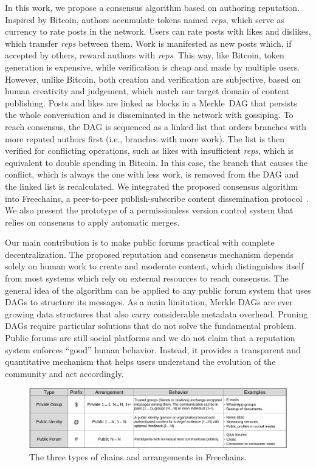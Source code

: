 \documentclass[10pt,journal,compsoc]{IEEEtran}
\newcommand{\FC}       {Freechains\xspace}
\newcommand{\reps}     {\emph{reps}\xspace}
\begin{document}
In this work, we propose a consensus algorithm based on authoring reputation.
Inspired by Bitcoin, authors accumulate tokens named \reps, which serve as
currency to rate posts in the network.
Users can rate posts with likes and dislikes, which transfer \reps between
them.
Work is manifested as new posts which, if accepted by others, reward authors
with \reps.
This way, like Bitcoin, token generation is expensive, while verification is
cheap and made by multiple users.
However, unlike Bitcoin, both creation and verification are subjective, based
on human creativity and judgement, which match our target domain of content
publishing.
Posts and likes are linked as blocks in a Merkle~DAG that persists the whole
conversation and is disseminated in the network with gossiping.
To reach consensus, the DAG is sequenced as a linked list that orders branches
with more reputed authors first (i.e., branches with more work).
The list is then verified for conflicting operations, such as likes with
insufficient \reps, which is equivalent to double spending in Bitcoin.
In this case, the branch that causes the conflict, which is always the one with
less work, is removed from the DAG and the linked list is recalculated.
We integrated the proposed consensus algorithm into Freechains, a peer-to-peer
publish-subscribe content dissemination protocol~\cite{fcs.sbseg20}.
We also present the prototype of a permissionless version control system that
relies on consensus to apply automatic merges.

Our main contribution is to make public forums practical with complete
decentralization.
The proposed reputation and consensus mechanism depends solely on human work to
create and moderate content, which distinguishes itself from most systems which
rely on external resources to reach consensus.
The general idea of the algorithm can be applied to any public forum system
that uses DAGs to structure its messages.
%
As a main limitation, Merkle DAGs are ever growing data structures that also
carry considerable metadata overhead.
Pruning DAGs require particular solutions that do not solve the fundamental
problem.
%
Public forums are still social platforms and we do not claim that a reputation
system enforces ``good'' human behavior.
Instead, it provides a transparent and quantitative mechanism that helps users
understand the evolution of the community and act accordingly.

\begin{figure}
\centering
\includegraphics[width=\textwidth]{arrangements.png}
\caption{The three types of chains and arrangements in \FC.}
\label{fig.table}
\end{figure}
\end{document}
